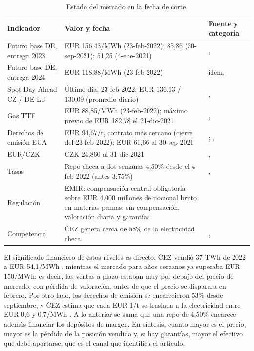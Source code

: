 \documentclass[11pt,letterpaper]{article}
\theoremstyle{plain}
\theoremstyle{definition}
\theoremstyle{remark}
\numberwithin{equation}{section}
\newcommand{\sw}{\begin{singlespace}}
\newcommand{\ew}{\end{singlespace}}
\begin{document}
\sw
\begin{table}[ht]
	\centering
	\footnotesize
		\begin{tabularx}{\textwidth}{@{}>{\RaggedRight}p{3.0cm}>{\RaggedRight}X>{\RaggedRight}p{3.4cm}@{}}
			\toprule
				Indicador & Valor y fecha & Fuente y categoría \\
			\midrule
				Futuro base DE, entrega 2023 & EUR 156,43/MWh (23-feb-2022); 85,86 (30-sep-2021); 51,25 (4-ene-2021) & \textcite{energycharts_futuros_de},  \\
				Futuro base DE, entrega 2024 & EUR 118,88/MWh (23-feb-2022) & ídem,  \\
				Spot Day Ahead CZ / DE-LU & Último día, 23-feb-2022: EUR 136,63 / 130,09 (promedio diario) & \textcite{energycharts_spot2022},  \\
				Gas TTF & EUR 88,85/MWh (23-feb-2022); máximo previo de EUR 182,78 el 21-dic-2021 & \textcite{platts_ttf_2022},  \\
				Derechos de emisión EUA & EUR 94,67/t, contrato más cercano (cierre del 23-feb-2022); EUR 61,66 al 30-sep-2021 & \textcite{gasstrategies_2022}; \parencite[p.~18]{cez_interim_q3_2021},  \\
				EUR/CZK & CZK 24,860 al 31-dic-2021 & \parencite[p.~30]{cez_fs_2021},  \\
				Tasas & Repo checa a dos semanas 4,50\% desde el 4-feb-2022 (antes 3,75\%)& \textcite{cnb_2022},  \\
				Regulación & EMIR: compensación central obligatoria sobre EUR 4.000 millones de nocional bruto en materias primas; sin compensación, valoración diaria y garantías & \parencite[p.~18]{GIANNOZZI2026107700}\\
				Competencia & ČEZ genera cerca de 58\% de la electricidad checa & \parencite[p.~11]{cez_fs_2021},  \\
			\bottomrule
		\end{tabularx}
	\caption{Estado del mercado en la fecha de corte.}
	\label{tab:mercado}
\end{table}
\ew

El significado financiero de estos niveles es directo. ČEZ vendió 37 TWh de 2022 a EUR 54,1/MWh \parencite{cez_q3_2021}, mientras el mercado para años cercanos ya superaba EUR 150/MWh; es decir, las ventas a plazo estaban muy por debajo del precio de mercado, con pérdida de valoración, antes de que el precio se disparara en febrero. Por otro lado, los derechos de emisión se encarecieron 53\% desde septiembre, y ČEZ estima que cada EUR 1/t se traslada a la electricidad entre EUR 0,6 y 0,7/MWh \parencite{cez_story_2022}. A lo anterior se suma que una repo de 4,50\% encarece además financiar los depósitos de margen. En síntesis, cuanto mayor es el precio, mayor es la pérdida de la posición vendida y, si hay garantías, mayor el efectivo que debe aportarse, que es el canal que identifica el artículo.
\end{document}
